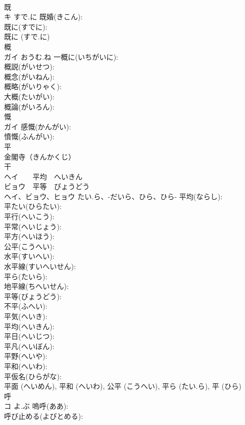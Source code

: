 \documentclass[8pt]{extreport}
\begin{document}
\begin{CJK}{UTF8}{min}
\\	既			
\\	キ	すで.に	既婚(きこん): 
\\	既に(すでに): 
\\	既に (すで.に)
\\	概			
\\	ガイ	おうむ.ね	一概に(いちがいに): 
\\	概説(がいせつ): 
\\	概念(がいねん): 
\\	概略(がいりゃく): 
\\	大概(たいがい): 
\\	概論(がいろん): 
\\	慨			
\\	ガイ		感慨(かんがい): 
\\	憤慨(ふんがい): 
\\	平			
\\	金閣寺（きんかくじ） 
\\	干 
\\	ヘイ　　平均　へいきん
\\	ビョウ　平等　びょうどう
\\	ヘイ、ビョウ、ヒョウ	たい.ら、-だいら、ひら、ひら-	平均(ならし): 
\\	平たい(ひらたい): 
\\	平行(へいこう): 
\\	平常(へいじょう): 
\\	平方(へいほう): 
\\	公平(こうへい): 
\\	水平(すいへい): 
\\	水平線(すいへいせん): 
\\	平ら(たいら): 
\\	地平線(ちへいせん): 
\\	平等(びょうどう): 
\\	不平(ふへい): 
\\	平気(へいき): 
\\	平均(へいきん): 
\\	平日(へいじつ): 
\\	平凡(へいぼん): 
\\	平野(へいや): 
\\	平和(へいわ): 
\\	平仮名(ひらがな): 
\\	平面 (へいめん), 平和 (へいわ), 公平 (こうへい), 平ら (たい.ら), 平 (ひら)
\\	呼			
\\	コ	よ.ぶ	嗚呼(ああ): 
\\	呼び止める(よびとめる): 

\end{CJK}
\end{document}
